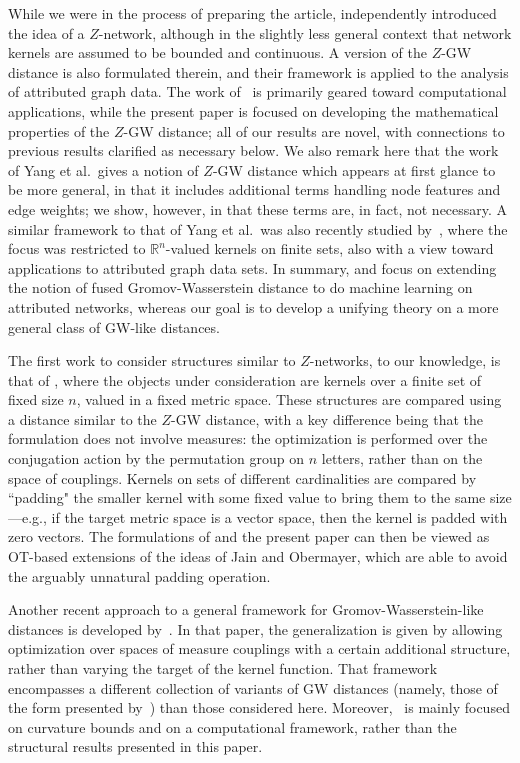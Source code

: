 \documentclass[twoside,11pt]{article}
\theoremstyle{definition}
\newcommand{\R}{\mathbb{R}}
\begin{document}
    While we were in the process of preparing the article, \citet{yang2023exploiting} independently introduced the idea of a $Z$-network, although in the slightly less general context that network kernels are assumed to be bounded and continuous. A version of the $Z$-GW distance is also formulated therein, and their framework is applied to the analysis of attributed graph data. The work of~\citet{yang2023exploiting} is primarily geared toward computational applications, while the present paper is focused on developing the mathematical properties of the $Z$-GW distance; all of our results are novel, with connections to previous results clarified as necessary below. We also remark here that the work of Yang et al.\ gives a notion of $Z$-GW distance which appears at first glance to be more general, in that it includes additional terms handling node features and edge weights; we show, however, in  that these terms are, in fact, not necessary. A similar framework to that of Yang et al.\ was also recently studied by~\citet{kawano2024multi}, where the focus was restricted to $\R^n$-valued kernels on finite sets, also with a view toward applications to attributed graph data sets. In summary, \cite{yang2023exploiting} and \cite{kawano2024multi} focus on extending the notion of fused Gromov-Wasserstein distance to do machine learning on attributed networks, whereas our goal is to develop a unifying theory on a more general class of GW-like distances.
    
    The first work to consider structures similar to $Z$-networks, to our knowledge, is that of \citet{jain2009structure}, where the objects under consideration are kernels over a finite set of fixed size $n$, valued in a fixed metric space. These structures are compared using a distance similar to the $Z$-GW distance, with a key difference being that the formulation does not involve measures: the optimization is performed over the conjugation action by the permutation group on $n$ letters, rather than on the space of couplings. Kernels on sets of different cardinalities are compared by ``padding" the smaller kernel with some fixed value to bring them to the same size---e.g., if the target metric space is a vector space, then the kernel is padded with zero vectors. The formulations of \citet{yang2023exploiting,kawano2024multi} and the present paper can then be viewed as OT-based extensions of the ideas of Jain and Obermayer, which are able to avoid the arguably unnatural padding operation.

    Another recent approach to a general framework for Gromov-Wasserstein-like distances is developed by~\citet{zhang2024geometry}. In that paper, the generalization is given by allowing optimization over spaces of measure couplings with a certain additional structure, rather than varying the target of the kernel function. That framework encompasses a different collection of variants of GW distances (namely, those of the form presented by~\citealt{chowdhury2023hypergraph,titouan2020co}) than those considered here. Moreover,~\citealt{zhang2024geometry} is mainly focused on curvature bounds and on a computational framework, rather than the structural results presented in this paper. 
    
\end{document}
